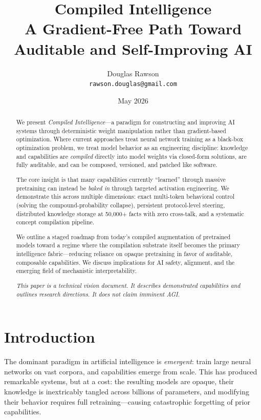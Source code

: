 \documentclass[11pt,a4paper]{article}
\title{\textbf{Compiled Intelligence}\\[4pt]
       \large A Gradient-Free Path Toward Auditable and Self-Improving AI}
\author{Douglas Rawson\\ \texttt{rawson.douglas@gmail.com}}
\date{May 2026}
\begin{document}
\maketitle

\begin{abstract}
We present \emph{Compiled Intelligence}---a paradigm for constructing and improving AI systems through deterministic weight manipulation rather than gradient-based optimization. Where current approaches treat neural network training as a black-box optimization problem, we treat model behavior as an engineering discipline: knowledge and capabilities are \emph{compiled} directly into model weights via closed-form solutions, are fully auditable, and can be composed, versioned, and patched like software.

The core insight is that many capabilities currently ``learned'' through massive pretraining can instead be \emph{baked in} through targeted activation engineering. We demonstrate this across multiple dimensions: exact multi-token behavioral control (solving the compound-probability collapse), persistent protocol-level steering, distributed knowledge storage at 50,000+ facts with zero cross-talk, and a systematic concept compilation pipeline.

We outline a staged roadmap from today's compiled augmentation of pretrained models toward a regime where the compilation substrate itself becomes the primary intelligence fabric---reducing reliance on opaque pretraining in favor of auditable, composable capabilities. We discuss implications for AI safety, alignment, and the emerging field of mechanistic interpretability.

\emph{This paper is a technical vision document. It describes demonstrated capabilities and outlines research directions. It does not claim imminent AGI.}
\end{abstract}

\section{Introduction}

The dominant paradigm in artificial intelligence is \emph{emergent}: train large neural networks on vast corpora, and capabilities emerge from scale. This has produced remarkable systems, but at a cost: the resulting models are opaque, their knowledge is inextricably tangled across billions of parameters, and modifying their behavior requires full retraining---causing catastrophic forgetting of prior capabilities.
\end{document}
